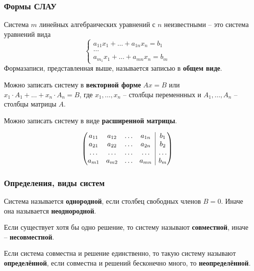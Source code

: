 \documentclass{article}
\begin{document}
\subsubsection{Формы СЛАУ}
Система $m$ линейных алгебраических уравнений с $n$ неизвестными -- это система уравнений вида
\[
\begin{cases}
a_{11}x_1+\ldots+a_{1n}x_n=b_1 \\
\ldots \\
a_{m_1}x_1+\ldots+a_{mn}x_n=b_m
\end{cases}
\]
Формазаписи, представленная выше, называется записью в \textbf{общем виде}.

Можно записать систему в \textbf{векторной форме} $Ax=B$ или $x_1\cdot A_1+\ldots+x_n\cdot A_n=B$, где $x_1,\ldots,x_n$ -- столбцы переменнных и $A_1,\ldots,A_n$ -- столбцы матрицы $A$. 

Можно записать систему в виде \textbf{расширенной матрицы}.

\[
\left( \begin{array}{@{}c|c@{}}
   \begin{matrix}
      a_{11} & a_{12} & \ldots & a_{1n} \\
      a_{21} & a_{22} & \ldots & a_{2n} \\
      \ldots & \ldots & \ldots & \ldots \\
      a_{m1} & a_{m2} & \ldots & a_{mn}
   \end{matrix} 
   &
   \begin{matrix}
      b_1 \\
      b_2 \\
      \ldots \\
      b_m 
      \end{matrix} 
    \end{array} \right)
\]

\subsubsection{Определения, виды систем}
Система называется \textbf{однородной}, если столбец свободных членов $B = 0$. Иначе она называется \textbf{неоднородной}.

Если существует хотя бы одно решение, то систему называют \textbf{совместной}, иначе -- \textbf{несовместной}.

Если система совместна и решение единственно, то такую систему называют \textbf{определённой}, если совместна и решений бесконечно много, то \textbf{неопределённой}.
\end{document}
